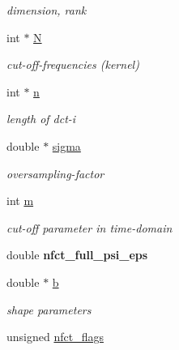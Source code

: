\begin{CompactItemize}
\begin{CompactList}\small\item\em dimension, rank \item\end{CompactList}\item 
\hypertarget{structnfct__plan_o5}{
int $\ast$ \hyperlink{structnfct__plan_o5}{N}}
\label{structnfct__plan_o5}

\begin{CompactList}\small\item\em cut-off-frequencies (kernel) \item\end{CompactList}\item 
\hypertarget{structnfct__plan_o6}{
int $\ast$ \hyperlink{structnfct__plan_o6}{n}}
\label{structnfct__plan_o6}

\begin{CompactList}\small\item\em length of dct-i \item\end{CompactList}\item 
\hypertarget{structnfct__plan_o7}{
double $\ast$ \hyperlink{structnfct__plan_o7}{sigma}}
\label{structnfct__plan_o7}

\begin{CompactList}\small\item\em oversampling-factor \item\end{CompactList}\item 
\hypertarget{structnfct__plan_o8}{
int \hyperlink{structnfct__plan_o8}{m}}
\label{structnfct__plan_o8}

\begin{CompactList}\small\item\em cut-off parameter in time-domain \item\end{CompactList}\item 
\hypertarget{structnfct__plan_o9}{
double {\bf nfct\_\-full\_\-psi\_\-eps}}
\label{structnfct__plan_o9}

\item 
\hypertarget{structnfct__plan_o10}{
double $\ast$ \hyperlink{structnfct__plan_o10}{b}}
\label{structnfct__plan_o10}

\begin{CompactList}\small\item\em shape parameters \item\end{CompactList}\item 
\hypertarget{structnfct__plan_o11}{
unsigned \hyperlink{structnfct__plan_o11}{nfct\_\-flags}}
\label{structnfct__plan_o11}


\end{CompactItemize}

